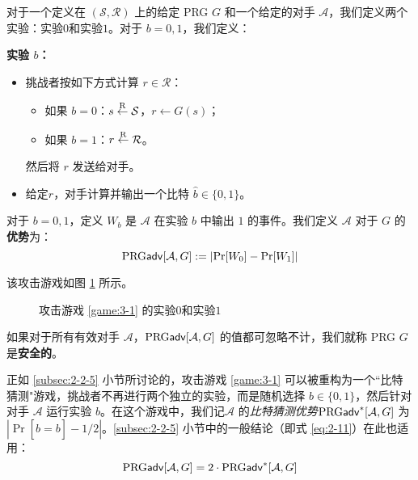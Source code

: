 \begin{game}[伪随机生成器]\label{game:3-1}
对于一个定义在 $(\mathcal{S},\mathcal{R})$ 上的给定 PRG $G$ 和一个给定的对手 $\mathcal{A}$，我们定义两个实验：实验$0$和实验$1$。对于 $b=0,1$，我们定义：

\noindent\textbf{实验 $b$：}
\begin{itemize}
	\item 挑战者按如下方式计算 $r\in\mathcal{R}$：
	\begin{itemize}
		\item 如果 $b=0$：$s\overset{\rm R}\leftarrow\mathcal{S}$，$r\leftarrow G(s)$；
		\item 如果 $b=1$：$r\overset{\rm R}\leftarrow\mathcal{R}$。
	\end{itemize}
	然后将 $r$ 发送给对手。
	\item 给定$r$，对手计算并输出一个比特 $\hat{b}\in\{0,1\}$。
\end{itemize}

对于 $b=0,1$，定义 $W_b$ 是 $\mathcal{A}$ 在实验 $b$ 中输出 $1$ 的事件。我们定义 $\mathcal{A}$ 对于 $G$ 的\textbf{优势}为：
$$
{\rm PRG\mathsf{adv}}[\mathcal{A},G]:=|{\rm Pr}[W_0]-{\rm Pr}[W_1]|
$$
\end{game}

该攻击游戏如图 \ref{fig:3-1} 所示。

\begin{figure}
	\centering
	
	\caption{攻击游戏 \ref{game:3-1} 的实验$0$和实验$1$}
	\label{fig:3-1}
\end{figure}

\begin{definition}\label{def:3-1}
如果对于所有有效对手 $\mathcal{A}$，${\rm PRG\mathsf{adv}}[\mathcal{A},G]$ 的值都可忽略不计，我们就称 PRG $G$ 是\textbf{安全的}。

\end{definition}

正如 \ref{subsec:2-2-5} 小节所讨论的，攻击游戏 \ref{game:3-1} 可以被重构为一个``比特猜测"游戏，挑战者不再进行两个独立的实验，而是随机选择 $b\in\{0,1\}$，然后针对对手 $\mathcal{A}$ 运行实验 $b$。在这个游戏中，我们记$\mathcal{A}$ 的\emph{比特猜测优势}${\rm PRG\mathsf{adv}}^*[\mathcal{A},G]$ 为 $|\Pr[\hat b=b]-{1}/{2}|$。\ref{subsec:2-2-5} 小节中的一般结论（即式 \ref{eq:2-11}）在此也适用：
\begin{equation}
{\rm PRG\mathsf{adv}}[\mathcal{A},G]=2\cdot{\rm PRG\mathsf{adv}}^*[\mathcal{A},G]
\end{equation}


